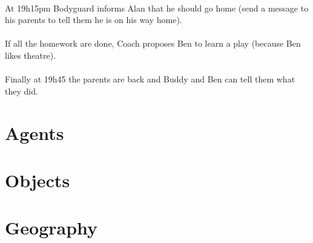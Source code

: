 \paragraph{}
At 19h15pm Bodyguard informs Alan that he should go home (send a message to his parents to tell them he is on his way home). 
\paragraph{}
If all the homework are done, Coach proposes Ben to learn a play (because Ben likes theatre). 
\paragraph{}
Finally at 19h45 the parents are back and Buddy and Ben can tell them what they did. 
\section{Agents}
\section{Objects}
\section{Geography}
